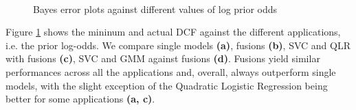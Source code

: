 \begin{figure}[H]
	\\
	\caption{Bayes error plots against different values of log prior odds}
	\label{fig:bayes_err}
\end{figure}




Figure \ref{fig:bayes_err} shows the mininum and actual DCF against the different applications, i.e. the \columnbreak prior log-odds. We compare single models \textbf{(a)}, fusions \textbf{(b)}, SVC and QLR with fusions \textbf{(c)}, SVC and GMM against fusions \textbf{(d)}.  
Fusions yield similar performances across all the applications and, overall, always outperform single models, with the slight exception of the Quadratic Logistic Regression being better for some applications \textbf{(a, c)}. 

